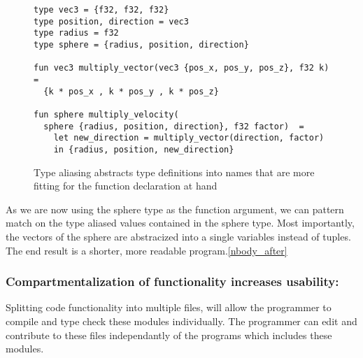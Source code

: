 \begin{figure}
\begin{verbatim}
type vec3 = {f32, f32, f32}
type position, direction = vec3 
type radius = f32
type sphere = {radius, position, direction}

fun vec3 multiply_vector(vec3 {pos_x, pos_y, pos_z}, f32 k) =
  {k * pos_x , k * pos_y , k * pos_z}

fun sphere multiply_velocity(
  sphere {radius, position, direction}, f32 factor)  =
    let new_direction = multiply_vector(direction, factor)
    in {radius, position, new_direction}
\end{verbatim}
\caption{Type aliasing abstracts type definitions into names that are more
  fitting for the function declaration at hand \label{sphere_example}}
\end{figure}

\noindent As we are now using the sphere type as the function argument, we can pattern
match on the type aliased values contained in the sphere type.
Most importantly, the vectors of the sphere are abstracized into a single variables
instead of tuples.
\\
The end result is a shorter, more readable program.\ref{nbody_after}

\subsubsection{Compartmentalization of functionality increases usability:}
Splitting code functionality into multiple files, will allow the programmer to
compile and type check these modules individually. The programmer can edit and
contribute to these files independantly of the programs which includes these
modules.

